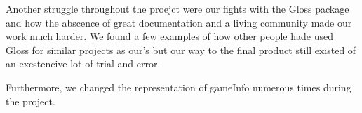 \documentclass[12pt, a4paper]{article}
\begin{document}
Another struggle throughout the proejct were our fights with the Gloss package and how the abscence of great documentation and a living community made our work much harder. We found a few examples of how other people hade used Gloss for similar projects as our's but our way to the final product still existed of an excstencive lot of trial and error.

Furthermore, we changed the representation of gameInfo numerous times during the project. 
\end{document}
